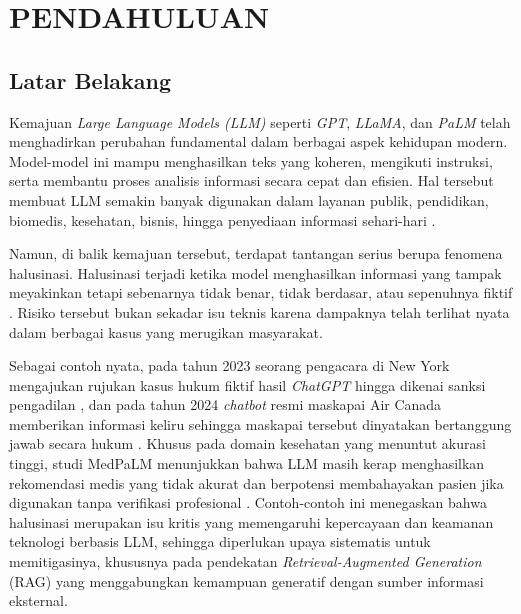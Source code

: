 \chapter{PENDAHULUAN}
\label{chap:pendahuluan}

\section{Latar Belakang}

Kemajuan \textit{Large Language Models (LLM)} seperti \textit{GPT}, \textit{LLaMA}, dan \textit{PaLM} telah menghadirkan perubahan fundamental dalam berbagai aspek kehidupan modern. Model-model ini mampu menghasilkan teks yang koheren, mengikuti instruksi, serta membantu proses analisis informasi secara cepat dan efisien. Hal tersebut membuat LLM semakin banyak digunakan dalam layanan publik, pendidikan, biomedis, kesehatan, bisnis, hingga penyediaan informasi sehari-hari \parencite{math2024hallucination}.

Namun, di balik kemajuan tersebut, terdapat tantangan serius berupa fenomena halusinasi. Halusinasi terjadi ketika model menghasilkan informasi yang tampak meyakinkan tetapi sebenarnya tidak benar, tidak berdasar, atau sepenuhnya fiktif \parencite{lettucedetect2024}. Risiko tersebut bukan sekadar isu teknis karena dampaknya telah terlihat nyata dalam berbagai kasus yang merugikan masyarakat.

Sebagai contoh nyata, pada tahun 2023 seorang pengacara di New York mengajukan rujukan kasus hukum fiktif hasil \textit{ChatGPT} hingga dikenai sanksi pengadilan \parencite{schwartz2023chatgptlawcase}, dan pada tahun 2024 \textit{chatbot} resmi maskapai Air Canada memberikan informasi keliru sehingga maskapai tersebut dinyatakan bertanggung jawab secara hukum \parencite{aircanada2024refundcase}. Khusus pada domain kesehatan yang menuntut akurasi tinggi, studi MedPaLM menunjukkan bahwa LLM masih kerap menghasilkan rekomendasi medis yang tidak akurat dan berpotensi membahayakan pasien jika digunakan tanpa verifikasi profesional \parencite{singhal2023medpalm}. Contoh-contoh ini menegaskan bahwa halusinasi merupakan isu kritis yang memengaruhi kepercayaan dan keamanan teknologi berbasis LLM, sehingga diperlukan upaya sistematis untuk memitigasinya, khususnya pada pendekatan \textit{Retrieval-Augmented Generation} (RAG) yang menggabungkan kemampuan generatif dengan sumber informasi eksternal.

